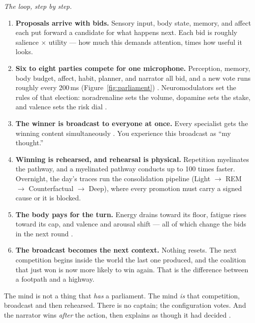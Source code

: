 \documentclass[11pt]{article}
\begin{document}
{\textit{The loop, step by step.}
\begin{enumerate}\itemsep2pt
\item \textbf{Proposals arrive with bids.} Sensory input, body state,
memory, and affect each put forward a candidate for what happens next.
Each bid is roughly salience $\times$ utility --- how much this demands
attention, times how useful it looks.
\item \textbf{Six to eight parties compete for one microphone.}
Perception, memory, body budget, affect, habit, planner, and narrator all
bid, and a new vote runs roughly every 200\,ms
(Figure~\ref{fig:parliament}) \citep{baars1997,atallah2026gwt}.
Neuromodulators set the rules of that election: noradrenaline sets the
volume, dopamine sets the stake, and valence sets the risk dial
\citep{sofroniew2026}.
\item \textbf{The winner is broadcast to everyone at once.} Every
specialist gets the winning content simultaneously \citep{baars1997}. You
experience this broadcast as ``my thought.''
\item \textbf{Winning is rehearsed, and rehearsal is physical.}
Repetition myelinates the pathway, and a myelinated pathway conducts up to
100 times faster. Overnight, the day's traces run the consolidation
pipeline (Light $\to$ REM $\to$ Counterfactual $\to$ Deep), where every
promotion must carry a signed cause or it is blocked.
\item \textbf{The body pays for the turn.} Energy drains toward its floor,
fatigue rises toward its cap, and valence and arousal shift --- all of
which change the bids in the next round \citep{seth2021}.
\item \textbf{The broadcast becomes the next context.} Nothing resets. The
next competition begins inside the world the last one produced, and the
coalition that just won is now more likely to win again. That is the
difference between a footpath and a highway.
\end{enumerate}

The mind is not a thing that \emph{has} a parliament. The mind \emph{is}
that competition, broadcast and then rehearsed. There is no captain; the
configuration votes. And the narrator wins \emph{after} the action, then
explains as though it had decided
\citep{gazzaniga2000,johansson2005,nisbett1977}.

}
\end{document}
